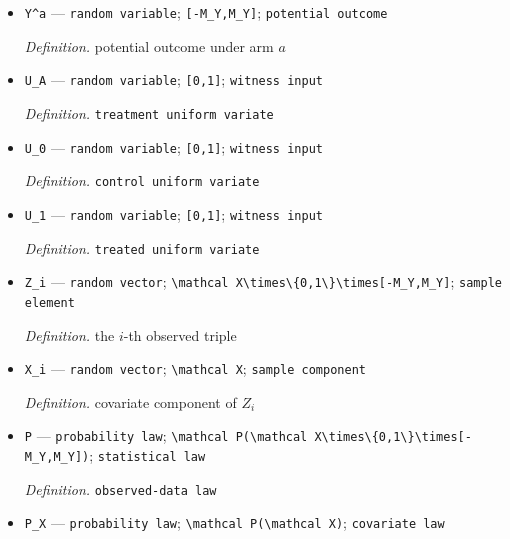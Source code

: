 \documentclass{article}
\begin{document}
\begin{itemize}
  \item \texttt{Y\textasciicircum{}a} --- \texttt{random variable}; \texttt{[-\allowbreak{}M\_\allowbreak{}Y,\allowbreak{}M\_\allowbreak{}Y]}; \texttt{potential outcome}
  \par\smallskip\noindent\emph{Definition.} potential outcome under arm \(a\)
  \item \texttt{U\_\allowbreak{}A} --- \texttt{random variable}; \texttt{[0,\allowbreak{}1]}; \texttt{witness input}
  \par\smallskip\noindent\emph{Definition.} \texttt{treatment uniform variate}
  \item \texttt{U\_\allowbreak{}0} --- \texttt{random variable}; \texttt{[0,\allowbreak{}1]}; \texttt{witness input}
  \par\smallskip\noindent\emph{Definition.} \texttt{control uniform variate}
  \item \texttt{U\_\allowbreak{}1} --- \texttt{random variable}; \texttt{[0,\allowbreak{}1]}; \texttt{witness input}
  \par\smallskip\noindent\emph{Definition.} \texttt{treated uniform variate}
  \item \texttt{Z\_\allowbreak{}i} --- \texttt{random vector}; \texttt{\textbackslash{}\allowbreak{}mathcal X\textbackslash{}\allowbreak{}times\textbackslash{}\allowbreak{}\{0,\allowbreak{}1\textbackslash{}\allowbreak{}\}\allowbreak{}\textbackslash{}\allowbreak{}times[-\allowbreak{}M\_\allowbreak{}Y,\allowbreak{}M\_\allowbreak{}Y]}; \texttt{sample element}
  \par\smallskip\noindent\emph{Definition.} the \(i\)-th observed triple
  \item \texttt{X\_\allowbreak{}i} --- \texttt{random vector}; \texttt{\textbackslash{}\allowbreak{}mathcal X}; \texttt{sample component}
  \par\smallskip\noindent\emph{Definition.} covariate component of \(Z_i\)
  \item \texttt{P} --- \texttt{probability law}; \texttt{\textbackslash{}\allowbreak{}mathcal P(\textbackslash{}\allowbreak{}mathcal X\textbackslash{}\allowbreak{}times\textbackslash{}\allowbreak{}\{0,\allowbreak{}1\textbackslash{}\allowbreak{}\}\allowbreak{}\textbackslash{}\allowbreak{}times[-\allowbreak{}M\_\allowbreak{}Y,\allowbreak{}M\_\allowbreak{}Y])}; \texttt{statistical law}
  \par\smallskip\noindent\emph{Definition.} \texttt{observed-\allowbreak{}data law}
  \item \texttt{P\_\allowbreak{}X} --- \texttt{probability law}; \texttt{\textbackslash{}\allowbreak{}mathcal P(\textbackslash{}\allowbreak{}mathcal X)}; \texttt{covariate law}

\end{itemize}
\end{document}
